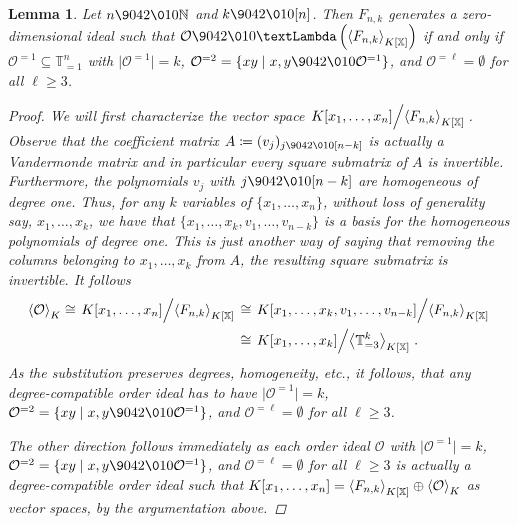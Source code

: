 \documentclass[11pt,oneside,english]{amsart}
\makeatletter
\numberwithin{equation}{section}
\numberwithin{figure}{section}
\theoremstyle{plain}
\theoremstyle{definition}
\theoremstyle{definition}
\theoremstyle{remark}
\theoremstyle{plain}
\newtheorem{lem}[thm]{Lemma}
\theoremstyle{plain}
\theoremstyle{plain}
\theoremstyle{problem@}
\makeatother
\begin{document}
\begin{lem}
\label{thm:thePolySystem}
Let $n {\9042\010} {\mathbb{N}}$ and $k{\9042\010} [n]$. Then $F_{n,k}$ generates a zero-dimensional
ideal such that ${\mathcal{O}} {\9042\010} {\textLambda} \left( {{\left\langle {F_{n,k}}\right\rangle}\sb{K[\mathbb{X}]}} \right)$ if and only if
${\mathcal{O}}^{=1} \subseteq {\mathbb{T}}^n_{=1}$ with $\lvert {\mathcal{O}}^{=1} \rvert = k$, ${\mathcal{O}}^{=2} = \{xy
\mid x,y {\9042\010} {\mathcal{O}}^{=1}\}$, and ${\mathcal{O}}^{=\ell} = \emptyset$ for all $\ell \geq 3$.
\begin{proof}
We will first characterize the vector space $\left. K[x_1, \dots, x_n]
  \middle/ {{\left\langle {F_{n,k}}\right\rangle}\sb{K[\mathbb{X}]}} \right.$. Observe that the coefficient matrix $A
\coloneqq (v_j)_{j {\9042\010} [n-k]}$ is actually a Vandermonde matrix and in
particular every square submatrix of $A$ is invertible. Furthermore, the
polynomials $v_j$ with $j {\9042\010} [n-k]$ are homogeneous of degree one. Thus, for
any $k$ variables of $\{x_1, \dots, x_n\}$, without loss of generality say,
$x_1, \dots, x_k$, we have that $\{x_1, \dots, x_k, v_1, \dots , v_{n-k}\}$ is
a basis for the homogeneous polynomials of degree one. This is just
another way of saying that removing the columns belonging to $x_1, \dots, x_k$
from $A$, the resulting square submatrix is invertible.  It follows
\begin{equation*}
  \begin{split}
    {{\left\langle {\mathcal{O}}\right\rangle}\sb{K}} \cong \left. K[x_1, \dots, x_n] \middle/ {{\left\langle {F_{n,k}}\right\rangle}\sb{K[\mathbb{X}]}} \right.
    &\cong \left. K[x_1, \dots, x_k, v_1, \dots , v_{n-k}] \middle/
      {{\left\langle {F_{n,k}}\right\rangle}\sb{K[\mathbb{X}]}} \right. \\
    &\cong \left. K[x_1, \dots, x_k] \middle/ {{\left\langle {{\mathbb{T}}^k_{=3}}\right\rangle}\sb{K[\mathbb{X}]}} \right. .
  \end{split}
\end{equation*}
As the substitution preserves degrees, homogeneity, etc., it follows, that any
degree-compatible order ideal has to have $\lvert {\mathcal{O}}^{=1} \rvert = k$,
${\mathcal{O}}^{=2} = \{xy \mid x,y {\9042\010} {\mathcal{O}}^{=1}\}$, and ${\mathcal{O}}^{=\ell} = \emptyset$ for
all $\ell \geq 3$.

The other direction follows immediately as each order ideal ${\mathcal{O}}$ with $\lvert
{\mathcal{O}}^{=1} \rvert = k$, ${\mathcal{O}}^{=2} = \{xy \mid x,y {\9042\010} {\mathcal{O}}^{=1}\}$, and
${\mathcal{O}}^{=\ell} = \emptyset$ for all $\ell \geq 3$ is actually a
degree-compatible order ideal such that $K[x_1,\dots, x_n] = 
{{\left\langle {F_{n,k}}\right\rangle}\sb{K[\mathbb{X}]}} \oplus {{\left\langle {\mathcal{O}}\right\rangle}\sb{K}}$ as vector spaces, by the argumentation above.
\end{proof}
\end{lem}
\end{document}

